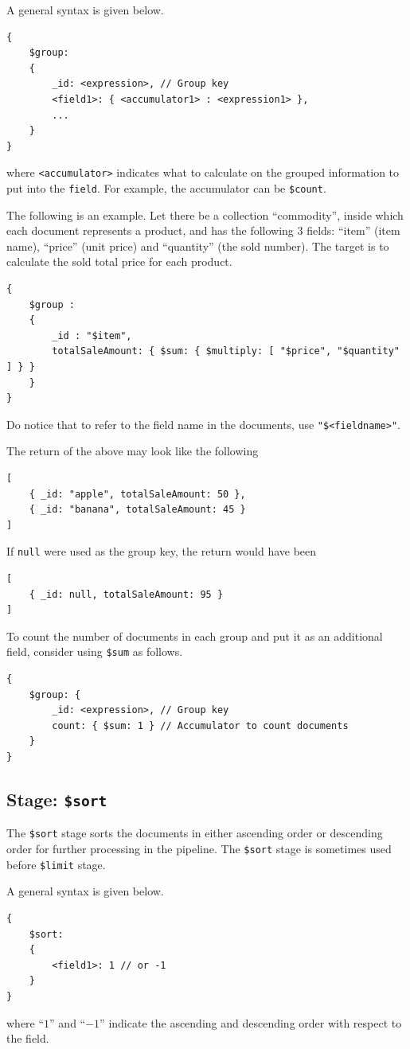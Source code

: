 A general syntax is given below.
\begin{lstlisting}
{
	$group:
	{
		_id: <expression>, // Group key
		<field1>: { <accumulator1> : <expression1> },
		...
	}
}
\end{lstlisting}
where \verb|<accumulator>| indicates what to calculate on the grouped information to put into the \verb|field|. For example, the accumulator can be \verb|$count|.

The following is an example. Let there be a collection ``commodity'', inside which each document represents a product, and has the following 3 fields: ``item'' (item name), ``price'' (unit price) and ``quantity'' (the sold number). The target is to calculate the sold total price for each product.
\begin{lstlisting}
{
	$group :
	{
		_id : "$item",
		totalSaleAmount: { $sum: { $multiply: [ "$price", "$quantity" ] } }
	}
}
\end{lstlisting}
Do notice that to refer to the field name in the documents, use \verb|"$<fieldname>"|.

The return of the above may look like the following
\begin{lstlisting}
[
	{ _id: "apple", totalSaleAmount: 50 },
	{ _id: "banana", totalSaleAmount: 45 }
]

\end{lstlisting}

If \verb|null| were used as the group key, the return would have been
\begin{lstlisting}
[
	{ _id: null, totalSaleAmount: 95 }
]
\end{lstlisting}

To count the number of documents in each group and put it as an additional field, consider using \verb|$sum| as follows.
\begin{lstlisting}
{
	$group: {
		_id: <expression>, // Group key
		count: { $sum: 1 } // Accumulator to count documents
	}
}
\end{lstlisting}

\subsection{Stage: \texttt{\$sort}}

The \verb|$sort| stage sorts the documents in either ascending order or descending order for further processing in the pipeline. The \verb|$sort| stage is sometimes used before \verb|$limit| stage.

A general syntax is given below.
\begin{lstlisting}
{
	$sort:
	{
		<field1>: 1 // or -1
	}
}
\end{lstlisting}
where ``$1$'' and ``$-1$'' indicate the ascending and descending order with respect to the field.

